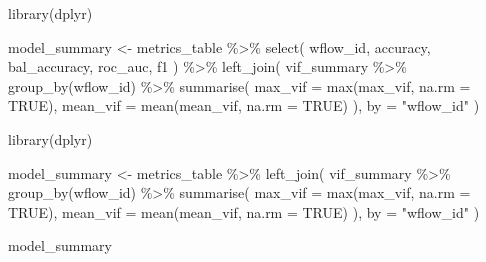 \documentclass[
  letterpaper,
  DIV=11,
  numbers=noendperiod]{scrartcl}
\newenvironment{Shaded}{\begin{snugshade}}{\end{snugshade}}
\newcommand{\AttributeTok}[1]{\textcolor[rgb]{0.40,0.45,0.13}{#1}}
\newcommand{\ConstantTok}[1]{\textcolor[rgb]{0.56,0.35,0.01}{#1}}
\newcommand{\FunctionTok}[1]{\textcolor[rgb]{0.28,0.35,0.67}{#1}}
\newcommand{\NormalTok}[1]{\textcolor[rgb]{0.00,0.23,0.31}{#1}}
\newcommand{\OtherTok}[1]{\textcolor[rgb]{0.00,0.23,0.31}{#1}}
\newcommand{\SpecialCharTok}[1]{\textcolor[rgb]{0.37,0.37,0.37}{#1}}
\newcommand{\StringTok}[1]{\textcolor[rgb]{0.13,0.47,0.30}{#1}}
\begin{document}
\begin{Shaded}
\begin{Highlighting}[]
\FunctionTok{library}\NormalTok{(dplyr)}

\NormalTok{model\_summary }\OtherTok{\textless{}{-}}\NormalTok{ metrics\_table }\SpecialCharTok{\%\textgreater{}\%}
  \FunctionTok{select}\NormalTok{(}
\NormalTok{    wflow\_id,}
\NormalTok{    accuracy,}
\NormalTok{    bal\_accuracy,}
\NormalTok{    roc\_auc,}
\NormalTok{    f1}
\NormalTok{  ) }\SpecialCharTok{\%\textgreater{}\%}
  \FunctionTok{left\_join}\NormalTok{(}
\NormalTok{    vif\_summary }\SpecialCharTok{\%\textgreater{}\%}
      \FunctionTok{group\_by}\NormalTok{(wflow\_id) }\SpecialCharTok{\%\textgreater{}\%}
      \FunctionTok{summarise}\NormalTok{(}
        \AttributeTok{max\_vif =} \FunctionTok{max}\NormalTok{(max\_vif, }\AttributeTok{na.rm =} \ConstantTok{TRUE}\NormalTok{),}
        \AttributeTok{mean\_vif =} \FunctionTok{mean}\NormalTok{(mean\_vif, }\AttributeTok{na.rm =} \ConstantTok{TRUE}\NormalTok{)}
\NormalTok{      ),}
    \AttributeTok{by =} \StringTok{"wflow\_id"}
\NormalTok{  )}
\end{Highlighting}
\end{Shaded}

\begin{Shaded}
\begin{Highlighting}[]
\FunctionTok{library}\NormalTok{(dplyr)}

\NormalTok{model\_summary }\OtherTok{\textless{}{-}}\NormalTok{ metrics\_table }\SpecialCharTok{\%\textgreater{}\%}
  \FunctionTok{left\_join}\NormalTok{(}
\NormalTok{    vif\_summary }\SpecialCharTok{\%\textgreater{}\%}
      \FunctionTok{group\_by}\NormalTok{(wflow\_id) }\SpecialCharTok{\%\textgreater{}\%}
      \FunctionTok{summarise}\NormalTok{(}
        \AttributeTok{max\_vif =} \FunctionTok{max}\NormalTok{(max\_vif, }\AttributeTok{na.rm =} \ConstantTok{TRUE}\NormalTok{),}
        \AttributeTok{mean\_vif =} \FunctionTok{mean}\NormalTok{(mean\_vif, }\AttributeTok{na.rm =} \ConstantTok{TRUE}\NormalTok{)}
\NormalTok{      ),}
    \AttributeTok{by =} \StringTok{"wflow\_id"}
\NormalTok{  )}
\end{Highlighting}
\end{Shaded}

\begin{Shaded}
\begin{Highlighting}[]
\NormalTok{model\_summary}
\end{Highlighting}
\end{Shaded}
\end{document}
